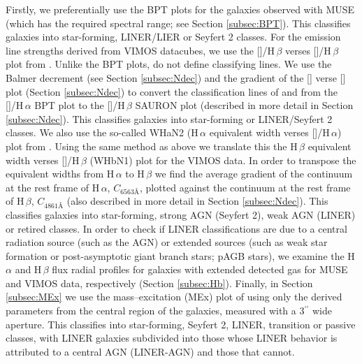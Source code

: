 	Firstly, we preferentially use the BPT plots for the galaxies observed with MUSE (which has the required spectral range; see Section \ref{subsec:BPT}). This classifies galaxies into star-forming, LINER/LIER or Seyfert 2 classes. For the emission line strengths derived from VIMOS datacubes, we use the []/H\,$\beta$ verses []/H\,$\beta$ plot from \citet[hereafter the SAURON plot]{Sarzi2010}. Unlike the BPT plots, \citet{Sarzi2010} do not define classifying lines. We use the Balmer decrement (see Section \ref{subsec:Ndec}) and the gradient of the [] verse [] plot (Section \ref{subsec:Ndec}) to convert the classification lines of \citet{Kewley2001} and \citet{Kauffmann2003a} from the []/H\,$\alpha$ BPT plot to the []/H\,$\beta$ SAURON plot (described in more detail in Section \ref{subsec:Ndec}). This classifies galaxies into star-forming or LINER/Seyfert 2 classes. We also use the so-called WHaN2 (H\,$\alpha$ equivalent width verses []/H\,$\alpha$) plot from \citet{}. Using the same method as above we translate this the H\,$\beta$ equivalent width verses []/H\,$\beta$ (WHbN1) plot for the VIMOS data. In order to transpose the equivalent widths from H\,$\alpha$ to H\,$\beta$ we find the average gradient of the continuum at the rest frame of H\,$\alpha$, $C_\text{6563\AA}$, plotted against the continuum at the rest frame of H\,$\beta$, $C_\text{4861\AA}$ (also described in more detail in Section \ref{subsec:Ndec}). This classifies galaxies into star-forming, strong AGN (Seyfert 2), weak AGN (LINER) or retired classes. In order to check if LINER classifications are due to a central radiation source (such as the AGN) or extended sources (such as weak star formation or post-asymptotic giant branch stars; pAGB stars), we examine the H\,$\alpha$ and H\,$\beta$ flux radial profiles for galaxies with extended detected gas for MUSE and VIMOS data, respectively (Section \ref{subsec:Hb}). Finally, in Section \ref{subsec:MEx} we use the mass--excitation (MEx) plot of \cite{Nyland2016} using only the derived parameters from the central region of the galaxies, measured with a 3$^{\prime\prime}$ wide aperture. This classifies into star-forming, Seyfert 2, LINER, transition or passive classes, with LINER galaxies subdivided into those whose LINER behavior is attributed to a central AGN (LINER-AGN) and those that cannot. 


